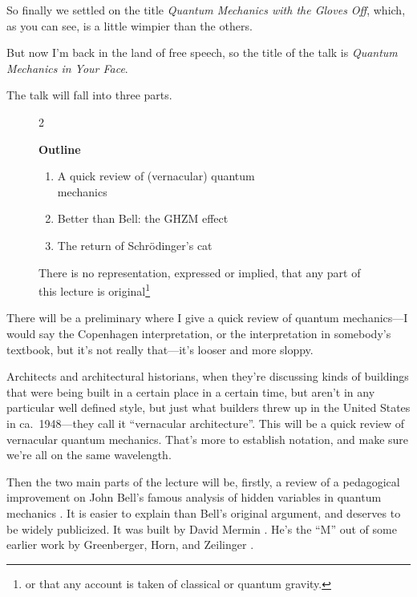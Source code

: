\documentclass[12pt,nofootinbib]{revtex4}
\begin{document}
So finally we settled on the title \emph{Quantum Mechanics with the Gloves Off}, which, as you can see, is a little wimpier than the others.

But now I'm back in the land of free speech, so the title of the talk is \emph{Quantum Mechanics in Your Face}.

The talk will fall into three parts.

\begin{figure}[htb] 
\begin{mdframed}
  \vspace{5pt}\hfill 2\\[-18pt]
  \begin{center}
    \textbf{Outline}
  \end{center}
  \begin{raggedright}
  \begin{enumerate}[label=(\arabic*)]
  \item A quick review of (vernacular) quantum \\ mechanics
  \item Better than Bell: the GHZM effect
  \item The return of Schrödinger's cat
  \end{enumerate}
    There is no representation, expressed or implied, that any part of this lecture is original\footnote{or that any account is taken of classical or quantum gravity.}
  \end{raggedright}
  \vspace{6pt}
\end{mdframed}
\end{figure}

There will be a preliminary where I give a quick review of quantum mechanics---I would say %
the Copenhagen interpretation, or the interpretation in somebody's textbook, but it's not really that---it's looser and more sloppy.

Architects and architectural historians, when they're discussing kinds of buildings that were being built in a certain place in a certain time, but aren't in any particular well defined style, but just what builders threw up in the United States in ca.\ 1948---they call it ``vernacular architecture''. This will be a quick review of vernacular quantum mechanics. That's more to establish notation, and make sure we're all on the same wavelength.

Then the two main parts of the lecture will be, firstly, a review of a pedagogical improvement on John Bell's famous analysis of hidden variables in quantum mechanics \cite{bell64physics195,bell66rmp447}. It is easier to explain than Bell's original argument, and deserves to be widely publicized. It was built by David Mermin \cite{mermin90ajp731,mermin90pt9}. He's the ``M'' out of some earlier work by Greenberger, Horn, and Zeilinger \cite{greenberger-89proc,greenberger-90ajp1131}.
\end{document}
